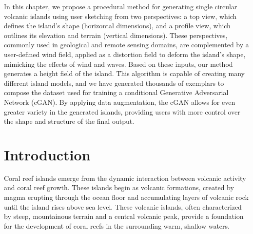 \abstract 
In this chapter, we propose a procedural method for generating single circular volcanic islands using user sketching from two perspectives: a top view, which defines the island’s shape (horizontal dimensions), and a profile view, which outlines its elevation and terrain (vertical dimensions). These perspectives, commonly used in geological and remote sensing domains, are complemented by a user-defined wind field, applied as a distortion field to deform the island’s shape, mimicking the effects of wind and waves. Based on these inputs, our method generates a height field of the island. This algorithm is capable of creating many different island models, and we have generated thousands of exemplars to compose the dataset used for training a conditional Generative Adversarial Network (cGAN). By applying data augmentation, the cGAN allows for even greater variety in the generated islands, providing users with more control over the shape and structure of the final output.
\pagebreak 

\minitoc

\section{Introduction}
\label{sec:coral-island_introduction}

Coral reef islands emerge from the dynamic interaction between volcanic activity and coral reef growth. These islands begin as volcanic formations, created by magma erupting through the ocean floor and accumulating layers of volcanic rock until the island rises above sea level. These volcanic islands, often characterized by steep, mountainous terrain and a central volcanic peak, provide a foundation for the development of coral reefs in the surrounding warm, shallow waters.

